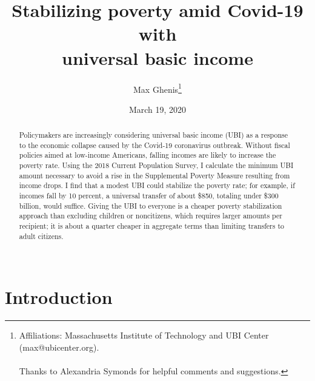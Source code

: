 \documentclass[12pt]{article}
\begin{document}
\begin{titlepage}
\title{Stabilizing poverty amid Covid-19 with
\protect \\universal basic income}
\author{Max Ghenis\thanks{Affiliations: Massachusetts Institute of Technology and UBI Center (max@ubicenter.org).
\protect \\
\protect \\Thanks to Alexandria Symonds for helpful comments and suggestions.
}}

\date{March 19, 2020}
\maketitle
\begin{abstract}
\noindent Policymakers are increasingly considering universal basic income (UBI) as a response to the economic collapse caused by the Covid-19 coronavirus outbreak. Without fiscal policies aimed at low-income Americans, falling incomes are likely to increase the poverty rate. Using the 2018 Current Population Survey, I calculate the minimum UBI amount necessary to avoid a rise in the Supplemental Poverty Measure resulting from income drops. I find that a modest UBI could stabilize the poverty rate; for example, if incomes fall by 10 percent, a universal transfer of about \$850, totaling under \$300 billion, would suffice. Giving the UBI to everyone is a cheaper poverty stabilization approach than excluding children or noncitizens, which requires larger amounts per recipient; it is about a quarter cheaper in aggregate terms than limiting transfers to adult citizens.
\vspace{1in}\\
\vspace{0in}\\

\bigskip
\end{abstract}
\setcounter{page}{0}
\thispagestyle{empty}
\end{titlepage}
\pagebreak \newpage




\doublespacing


\section{Introduction} \label{sec:introduction}
\end{document}
